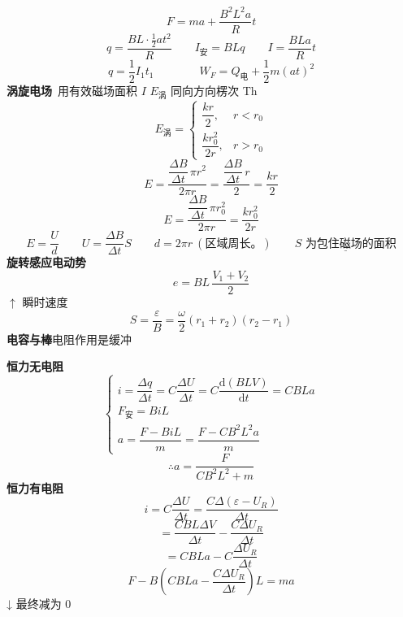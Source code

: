 \[ F=ma+\frac{B^2L^2a}{R}t \]
\[ q=\frac{BL\cdot\frac{1}{2}at^2}{R}\qquad I_{\text{安}}=BLq\qquad I=\frac{BLa}{R}t \] %
\[ q=\frac{1}{2}I_1t_1\qquad\qquad W_F=Q_{\text{电}}+\frac{1}{2}m(at)^2 \]
\textbf{涡旋电场}\quad {}\ 用有效磁场面积 %
$I$ $E_{\text{涡}}$ 同向\quad 方向楞次 Th
\[ E_{\text{涡}}=\left\{\begin{array}{ll}\dfrac{kr}{2}, & r<r_0\\[2ex] \dfrac{kr_0^2}{2r}, & r>r_0\end{array}\right. \]
\[ E=\frac{\dfrac{\Delta B}{\Delta t}\,\pi r^2}{2\pi r}=\frac{\dfrac{\Delta B}{\Delta t}\,r}{2}=\frac{kr}{2} \]
\[ E=\frac{\dfrac{\Delta B}{\Delta t}\,\pi r_0^2}{2\pi r}=\frac{kr_0^2}{2r} \]
\[ E=\frac{U}{d}\qquad U=\frac{\Delta B}{\Delta t}S\qquad d=2\pi r\ (\text{区域周长。})\qquad \underline{S\text{ 为包住磁场的面积}} \]
\textbf{旋转感应电动势}
\[ e=BL\,\frac{V_1+V_2}{2} \]
$\uparrow$ 瞬时速度 %
\[ S=\frac{\varepsilon}{B}=\frac{\omega}{2}(r_1+r_2)(r_2-r_1) \] %
\textbf{电容与棒}\quad 电阻作用是缓冲

\textbf{恒力无电阻} %
\[ \left\{\begin{array}{l}
i=\dfrac{\Delta q}{\Delta t}=C\dfrac{\Delta U}{\Delta t}=C\dfrac{\mathrm{d}(BLV)}{\mathrm{d}t}=CBLa\\[2.5ex]
F_{\text{安}}=BiL\\[1ex]
a=\dfrac{F-BiL}{m}=\dfrac{F-CB^2L^2a}{m}
\end{array}\right. \]
\[ \therefore a=\frac{F}{CB^2L^2+m} \]
\textbf{恒力有电阻} %
\[ i=C\frac{\Delta U}{\Delta t}=\frac{C\Delta(\varepsilon-U_R)}{\Delta t} \]
\[ =\frac{CBL\Delta V}{\Delta t}-\frac{C\Delta U_R}{\Delta t} \]
\[ =CBLa-C\frac{\Delta U_R}{\Delta t} \]
\[ F-B\left(CBLa-\frac{C\Delta U_R}{\Delta t}\right)L=ma \]
↓ 最终减为 0 %

